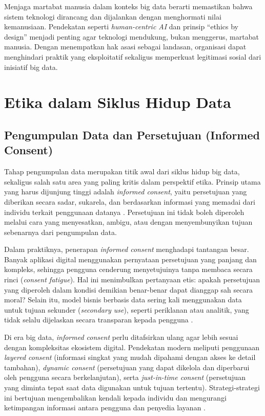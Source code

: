 Menjaga martabat manusia dalam konteks big data berarti memastikan bahwa sistem teknologi dirancang dan dijalankan dengan menghormati nilai kemanusiaan. Pendekatan seperti \textit{human-centric AI} dan prinsip “ethics by design” menjadi penting agar teknologi mendukung, bukan menggerus, martabat manusia. Dengan menempatkan hak asasi sebagai landasan, organisasi dapat menghindari praktik yang eksploitatif sekaligus memperkuat legitimasi sosial dari inisiatif big data.


\section{Etika dalam Siklus Hidup Data}

\subsection{Pengumpulan Data dan Persetujuan (Informed Consent)}

Tahap pengumpulan data merupakan titik awal dari siklus hidup big data, sekaligus salah satu area yang paling kritis dalam perspektif etika. Prinsip utama yang harus dijunjung tinggi adalah \textit{informed consent}, yaitu persetujuan yang diberikan secara sadar, sukarela, dan berdasarkan informasi yang memadai dari individu terkait penggunaan datanya \cite{solove2006privacy}. Persetujuan ini tidak boleh diperoleh melalui cara yang menyesatkan, ambigu, atau dengan menyembunyikan tujuan sebenarnya dari pengumpulan data.  

Dalam praktiknya, penerapan \textit{informed consent} menghadapi tantangan besar. Banyak aplikasi digital menggunakan pernyataan persetujuan yang panjang dan kompleks, sehingga pengguna cenderung menyetujuinya tanpa membaca secara rinci (\textit{consent fatigue}). Hal ini menimbulkan pertanyaan etis: apakah persetujuan yang diperoleh dalam kondisi demikian benar-benar dapat dianggap sah secara moral? Selain itu, model bisnis berbasis data sering kali menggunakan data untuk tujuan sekunder (\textit{secondary use}), seperti periklanan atau analitik, yang tidak selalu dijelaskan secara transparan kepada pengguna \cite{nissenbaum2004privacy}.  

Di era big data, \textit{informed consent} perlu ditafsirkan ulang agar lebih sesuai dengan kompleksitas ekosistem digital. Pendekatan modern meliputi penggunaan \textit{layered consent} (informasi singkat yang mudah dipahami dengan akses ke detail tambahan), \textit{dynamic consent} (persetujuan yang dapat dikelola dan diperbarui oleh pengguna secara berkelanjutan), serta \textit{just-in-time consent} (persetujuan yang diminta tepat saat data digunakan untuk tujuan tertentu). Strategi-strategi ini bertujuan mengembalikan kendali kepada individu dan mengurangi ketimpangan informasi antara pengguna dan penyedia layanan \cite{hallinan2020consent}.  

